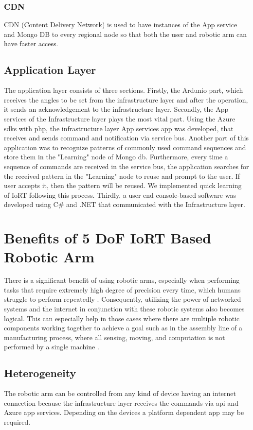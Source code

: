 \documentclass[conference]{IEEEtran}
\begin{document}
\subsubsection{CDN}
CDN (Content Delivery Network) is used to have instances of the App service and Mongo DB to every regional node so that both the user and robotic arm can have faster access.


 
\subsection{Application Layer}
The application layer consists of three sections. Firstly, the Ardunio part, which receives the angles to be set from the infrastructure layer and after the operation, it sends an acknowledgement to the infrastructure layer. Secondly, the App services of the Infrastructure layer plays the most vital part. Using the Azure sdks with php, the infrastructure layer App services app was developed, that receives and sends command and notification via service bus. Another part of this application was to recognize patterns of commonly used command sequences and store them in the "Learning" node of Mongo db. Furthermore, every time a sequence of commands are received in the service bus, the application searches for the received pattern in the "Learning" node to reuse and prompt to the user. If user accepts it, then the pattern will be reused. We implemented quick learning of IoRT following this process. Thirdly, a user end console-based software was developed using C\# and .NET that communicated with the Infrastructure layer.

\section{Benefits of 5 DoF IoRT Based Robotic Arm}
There is a significant benefit of using robotic arms, especially when performing tasks that require extremely high degree of precision every time, which humans struggle to perform repeatedly \cite{thirteen}. Consequently, utilizing the power of networked systems and the internet in conjunction with these robotic systems also becomes logical. This can especially help in those cases where there are multiple robotic components working together to achieve a goal such as in the assembly line of a manufacturing process, where all sensing, moving, and computation is not performed by a single machine \cite{fourteen}.
\subsection{Heterogeneity}
The robotic arm can be controlled from any kind of device having an internet connection because the infrastructure layer receives the commands via api and Azure app services. Depending on the devices a platform dependent app may be required.
\end{document}
